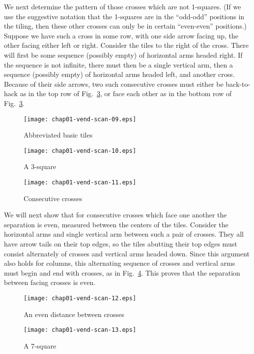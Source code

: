 \documentclass[reqno]{stml-l}
\theoremstyle{plain}
\theoremstyle{definition}
\numberwithin{equation}{chapter}
\begin{document}
We next determine the pattern of those crosses which are not 1-squares. (If we use the suggestive notation that the 1-squares are in the ``odd-odd'' positions in the tiling, then these other crosses can only be in certain ``even-even'' positions.) Suppose we have such a cross in
some row, with one side arrow facing up, the other facing either left or right. Consider the tiles to the right of the cross. There will first be some sequence (possibly empty) of horizontal arms headed right. If the sequence is not infinite, there must then be a single vertical arm, then a sequence (possibly empty) of horizontal arms headed left, and another cross. Because of their side arrows, two such consecutive
crosses must either be back-to-hack as in the top row of Fig.~\ref{ch01:fig24}, or face each other as in the bottom row of Fig.~\ref{ch01:fig24}.

\begin{figure}[!h]
\texttt{[image: chap01-vend-scan-09.eps]}
\caption{Abbreviated basic tiles }\label{ch01:fig22}
\end{figure}

\begin{figure}[!h]
\texttt{[image: chap01-vend-scan-10.eps]}
\caption{A 3-square}\label{ch01:fig23}
\end{figure}

\begin{figure}[!h]
\texttt{[image: chap01-vend-scan-11.eps]}
\caption{Consecutive crosses }\label{ch01:fig24}
\end{figure}

We will next show that for consecutive crosses which face one another the separation is even, measured between the centers of the tiles. Consider the horizontal arms and single vertical arm between such a pair of crosses. They all have arrow tails on their top edges, so the tiles abutting their top edges must consist alternately of crosses and vertical arms headed down. Since this argument also holds for columns, this alternating sequence of crosses and vertical arms must begin and end with crosses, as in Fig.~\ref{ch01:fig25}. This proves that the separation between facing crosses is even.

\begin{figure}[!h]
\texttt{[image: chap01-vend-scan-12.eps]}
\caption{An even distance between crosses }\label{ch01:fig25}
\end{figure}

\begin{figure}[!h]
\texttt{[image: chap01-vend-scan-13.eps]}
\caption{A 7-square}\label{ch01:fig26}
\end{figure}
\end{document}
